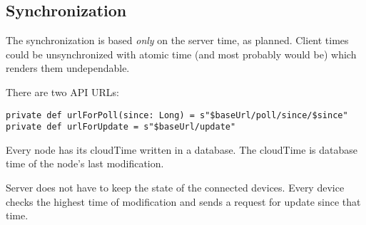 \subsection{Synchronization}
\label{subsection:akka-synchro}
The synchronization is based \emph{only} on the server time, as planned. Client times could be unsynchronized with atomic time (and most probably would be) which renders them undependable.

There are two API URLs:

\begin{verbatim}
private def urlForPoll(since: Long) = s"$baseUrl/poll/since/$since"
private def urlForUpdate = s"$baseUrl/update"
\end{verbatim}

Every node has its cloudTime written in a database. The cloudTime is database time of the node's last modification.

Server does not have to keep the state of the connected devices. Every device checks the highest time of modification and sends a request for update since that time.
